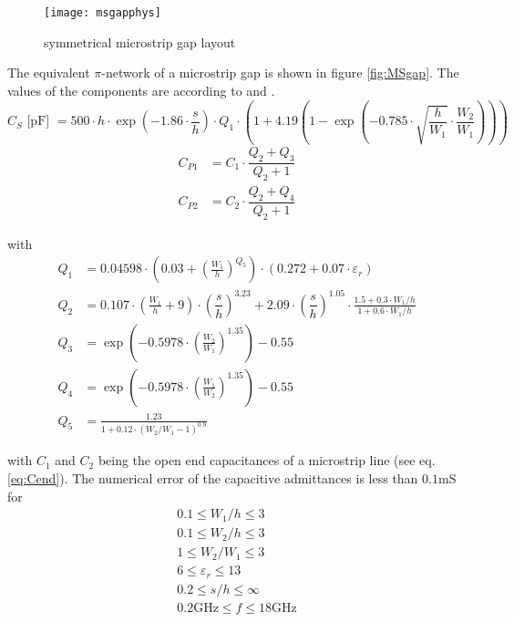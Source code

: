 \documentclass[10pt]{report}
\begin{document}
\begin{figure}[ht]
\begin{center}
\texttt{[image: msgapphys]}
\end{center}
\caption{symmetrical microstrip gap layout}
\label{fig:MSgaPhys}
\end{figure}
\FloatBarrier

The equivalent $\pi$-network of a microstrip gap is shown in figure
\ref{fig:MSgap}.  The values of the components are according to
\cite{Kirschning8} and \cite{Kirschning4}.
\begin{equation}
C_S \textrm{ [pF] } = 500\cdot h\cdot\exp\left( -1.86\cdot\dfrac{s}{h} \right)\cdot Q_1\cdot
       \left( 1 + 4.19\left( 1 - \exp\left( -0.785\cdot\sqrt{\dfrac{h}{W_1}}\cdot
       \dfrac{W_2}{W_1} \right) \right) \right)
\end{equation}
\begin{align}
C_{P1} &= C_1\cdot \dfrac{Q_2+Q_3}{Q_2+1}\\
C_{P2} &= C_2\cdot \dfrac{Q_2+Q_4}{Q_2+1}
\end{align}

with
\begin{align}
Q_1 &= 0.04598\cdot \left( 0.03 + \left(\frac{W_1}{h}\right)^{Q_5} \right)\cdot
      (0.272 + 0.07\cdot\varepsilon_r)\\
Q_2 &= 0.107\cdot\left( \frac{W_1}{h}+9 \right) \cdot \left( \dfrac{s}{h} \right)^{3.23}
    + 2.09 \cdot \left( \dfrac{s}{h} \right)^{1.05}\cdot
    \frac{1.5+0.3\cdot W_1/h}{1+0.6\cdot W_1/h}\\
Q_3 &= \exp\left( -0.5978\cdot \left( \frac{W_2}{W_1} \right)^{1.35} \right) - 0.55\\
Q_4 &= \exp\left( -0.5978\cdot \left( \frac{W_1}{W_2} \right)^{1.35} \right) - 0.55\\
Q_5 &= \frac{1.23}{1 + 0.12\cdot \left( W_2 / W_1 - 1 \right)^{0.9}}
\end{align}

with $C_1$ and $C_2$ being the open end capacitances of a microstrip
line (see eq. \eqref{eq:Cend}).  The numerical error of the
capacitive admittances is less than $0.1$mS for
\begin{equation*}
\begin{split}
0.1\le W_1/h \le 3 \\
0.1\le W_2/h \le 3 \\
1\le W_2/W_1 \le 3 \\
6\le \varepsilon_r \le 13 \\
0.2\le s/h \le \infty \\
0.2\text{GHz} \le f \le 18\text{GHz}
\end{split}
\end{equation*}
\end{document}
